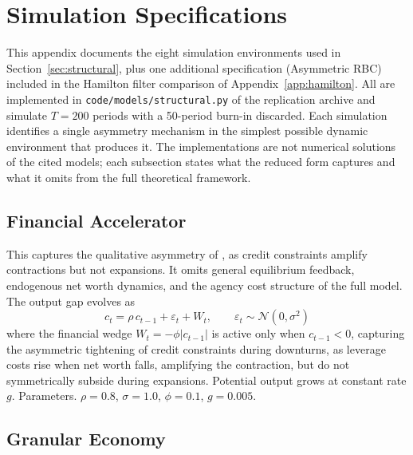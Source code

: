 \documentclass[10pt]{article}
\begin{document}

\section{Simulation Specifications}
\label{app:structural_specs}

This appendix documents the eight simulation environments used in Section~\ref{sec:structural}, plus one additional specification (Asymmetric RBC) included in the Hamilton filter comparison of Appendix~\ref{app:hamilton}. All are implemented in \texttt{code/models/structural.py} of the replication archive and simulate $T = 200$ periods with a 50-period burn-in discarded. Each simulation identifies a single asymmetry mechanism in the simplest possible dynamic environment that produces it. The implementations are not numerical solutions of the cited models; each subsection states what the reduced form captures and what it omits from the full theoretical framework.

\subsection*{Financial Accelerator}

This captures the qualitative asymmetry of \citet{bernanke_etal1999}, as credit constraints amplify contractions but not expansions. It omits general equilibrium feedback, endogenous net worth dynamics, and the agency cost structure of the full model. The output gap evolves as
\begin{equation}
c_t = \rho \, c_{t-1} + \varepsilon_t + W_t, \qquad \varepsilon_t \sim \mathcal{N}(0,\sigma^2)
\end{equation}
where the financial wedge $W_t = -\phi |c_{t-1}|$ is active only when $c_{t-1} < 0$, capturing the asymmetric tightening of credit constraints during downturns, as leverage costs rise when net worth falls, amplifying the contraction, but do not symmetrically subside during expansions. Potential output grows at constant rate $g$. Parameters. $\rho = 0.8$, $\sigma = 1.0$, $\phi = 0.1$, $g = 0.005$.

\subsection*{Granular Economy}
\end{document}
